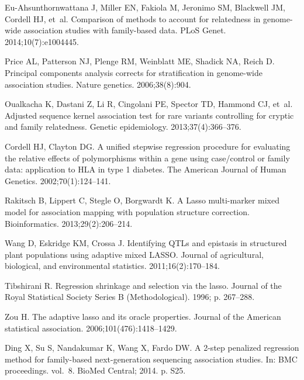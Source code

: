 \documentclass[10pt,letterpaper]{article}
\begin{document}
\begin{thebibliography}{10}
	Eu-Ahsunthornwattana J, Miller EN, Fakiola M, Jeronimo SM, Blackwell JM,
	Cordell HJ, et~al.
	\newblock Comparison of methods to account for relatedness in genome-wide
	association studies with family-based data.
	\newblock PLoS Genet. 2014;10(7):e1004445.
	
	Price AL, Patterson NJ, Plenge RM, Weinblatt ME, Shadick NA, Reich D.
	\newblock Principal components analysis corrects for stratification in
	genome-wide association studies.
	\newblock Nature genetics. 2006;38(8):904.
	
	Oualkacha K, Dastani Z, Li R, Cingolani PE, Spector TD, Hammond CJ, et~al.
	\newblock Adjusted sequence kernel association test for rare variants
	controlling for cryptic and family relatedness.
	\newblock Genetic epidemiology. 2013;37(4):366--376.
	
	Cordell HJ, Clayton DG.
	\newblock A unified stepwise regression procedure for evaluating the relative
	effects of polymorphisms within a gene using case/control or family data:
	application to HLA in type 1 diabetes.
	\newblock The American Journal of Human Genetics. 2002;70(1):124--141.
	
	Rakitsch B, Lippert C, Stegle O, Borgwardt K.
	\newblock A Lasso multi-marker mixed model for association mapping with
	population structure correction.
	\newblock Bioinformatics. 2013;29(2):206--214.
	
	Wang D, Eskridge KM, Crossa J.
	\newblock Identifying QTLs and epistasis in structured plant populations using
	adaptive mixed LASSO.
	\newblock Journal of agricultural, biological, and environmental statistics.
	2011;16(2):170--184.
	
	Tibshirani R.
	\newblock Regression shrinkage and selection via the lasso.
	\newblock Journal of the Royal Statistical Society Series B (Methodological).
	1996; p. 267--288.
	
	Zou H.
	\newblock The adaptive lasso and its oracle properties.
	\newblock Journal of the American statistical association.
	2006;101(476):1418--1429.
	
	Ding X, Su S, Nandakumar K, Wang X, Fardo DW.
	\newblock A 2-step penalized regression method for family-based next-generation
	sequencing association studies.
	\newblock In: BMC proceedings. vol.~8. BioMed Central; 2014. p. S25.
	

\end{thebibliography}
\end{document}
